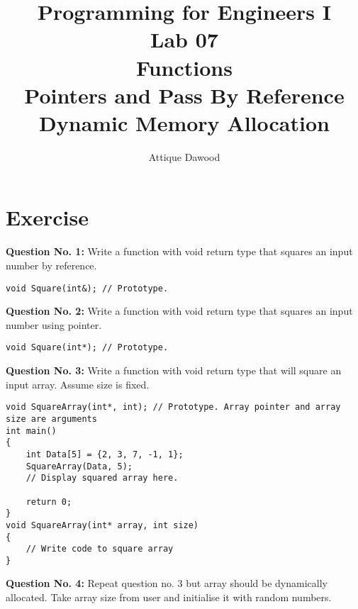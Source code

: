 \documentclass[12pt,a4paper]{article}
\title{Programming for Engineers I\\Lab 07\\Functions\\Pointers and Pass By Reference\\Dynamic Memory Allocation}
\author{Attique Dawood}
\begin{document}
\maketitle
\section{Exercise}
\textbf{Question No. 1:} Write a function with void return type that squares an input number by reference.
\begin{lstlisting}[caption={Square by reference}]
void Square(int&); // Prototype.
\end{lstlisting}
\textbf{Question No. 2:} Write a function with void return type that squares an input number using pointer.
\begin{lstlisting}[caption={Square using pointer}]
void Square(int*); // Prototype.
\end{lstlisting}
\textbf{Question No. 3:} Write a function with void return type that will square an input array. Assume size is fixed.
\begin{lstlisting}[caption={Square using array pointer}]
void SquareArray(int*, int); // Prototype. Array pointer and array size are arguments
int main()
{
	int Data[5] = {2, 3, 7, -1, 1};
	SquareArray(Data, 5);
	// Display squared array here.

	return 0;
}
void SquareArray(int* array, int size)
{
	// Write code to square array
}
\end{lstlisting}
\textbf{Question No. 4:} Repeat question no. 3 but array should be dynamically allocated. Take array size from user and initialise it with random numbers.
\end{document}
